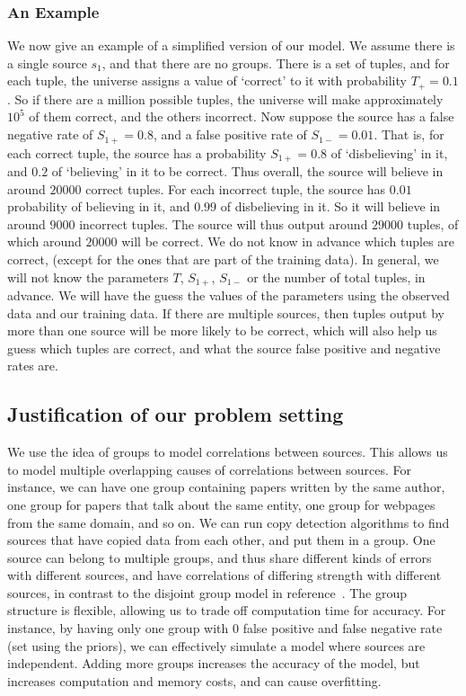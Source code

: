 \documentclass{sig-alternate}
\newcounter{prob}
\begin{document}
\subsubsection{An Example}\label{sec:causal-model-example}
We now give an example of a simplified version of our model. We assume there is a single source $s_1$, and that there are no groups. There is a set of tuples, and for each tuple, the universe assigns a value of `correct' to it with probability $T_{+}=0.1$. So if there are a million possible tuples, the universe will make approximately $10^5$ of them correct, and the others incorrect. Now suppose the source has a false negative rate of $S_{1+} = 0.8$, and a false positive rate of $S_{1-} = 0.01$. That is, for each correct tuple, the source has a probability $S_{1+} = 0.8$ of `disbelieving' in it, and $0.2$ of `believing' in it to be correct. Thus overall, the source will believe in around $20000$ correct tuples. For each incorrect tuple, the source has $0.01$ probability of believing in it, and $0.99$ of disbelieving in it. So it will believe in around $9000$ incorrect tuples. The source will thus output around $29000$ tuples, of which around $20000$ will be correct. We do not know in advance which tuples are correct, (except for the ones that are part of the training data). In general, we will not know the parameters $T$, $S_{1+}$, $S_{1-}$ or the number of total tuples, in advance. We will have the guess the values of the parameters using the observed data and our training data. If there are multiple sources, then tuples output by more than one source will be more likely to be correct, which will also help us guess which tuples are correct, and what the source false positive and negative rates are.

\subsection{Justification of our problem setting}
We use the idea of groups to model correlations between sources. This allows us to model multiple overlapping causes of correlations between sources. For instance, we can have one group containing papers written by the same author, one group for papers that talk about the same entity, one group for webpages from the same domain, and so on. We can run copy detection algorithms to find sources that have copied data from each other, and put them in a group. One source can belong to multiple groups, and thus share different kinds of errors with different sources, and have correlations of differing strength with different sources, in contrast to the disjoint group model in reference~\cite{Qi:2013:MCI:2488388.2488479}. The group structure is flexible, allowing us to trade off computation time for accuracy. For instance, by having only one group with $0$ false positive and false negative rate (set using the priors), we can effectively simulate a model where sources are independent. Adding more groups increases the accuracy of the model, but increases computation and memory costs, and can cause overfitting. 
\end{document}
